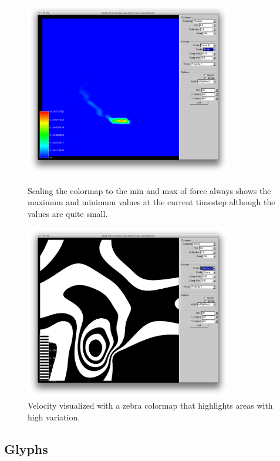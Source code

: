 \begin{figure}[htbp]
\centering
\begin{minipage}[t]{0.48\textwidth}
        \includegraphics[height=3in]{figures/colormaps/forceScaled.png}
\caption{Scaling the colormap to the min and max of force always shows the maximum and minimum values at the current timestep although the values are quite small.}
\label{fig:forceScaled}
\end{minipage}\hspace{.04\textwidth}%
\begin{minipage}[t]{0.48\textwidth}
        \includegraphics[height=3in]{figures/colormaps/velocityZebra.png}
    \caption{Velocity visualized with a zebra colormap that highlights areas with high variation.}
    \label{fig:velocityZebra}
\end{minipage}
\end{figure}


\clearpage
\subsection{Glyphs}


